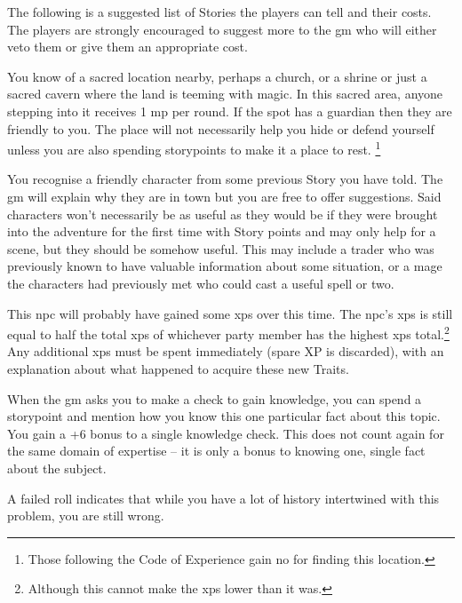 \begin{multicols}{2}

\noindent
The following is a suggested list of Stories the players can tell and their costs.
The players are strongly encouraged to suggest more to the \gls{gm} who will either veto them or give them an appropriate cost.

You know of a sacred location nearby, perhaps a church, or a shrine or just a sacred cavern where the land is teeming with magic.
In this sacred area, anyone stepping into it receives 1 \gls{mp} per \gls{round}.
If the spot has a guardian then they are friendly to you.
The place will not necessarily help you hide or defend yourself unless you are also spending \glspl{storypoint} to make it a place to rest.
\footnote{Those following the Code of Experience gain no  for finding this location.}

\label{oldnpc}
You recognise a friendly character from some previous Story you have told.
The \gls{gm} will explain why they are in town but you are free to offer suggestions.
Said characters won't necessarily be as useful as they would be if they were brought into the adventure for the first time with Story points and may only help for a scene, but they should be somehow useful.
This may include a trader who was previously known to have valuable information about some situation, or a mage the characters had previously met who could cast a useful spell or two.

This \gls{npc} will probably have gained some \glspl{xp} over this time.
The \gls{npc}'s \glspl{xp} is still equal to half the total \glspl{xp} of whichever party member has the highest \glspl{xp} total.\footnote{Although this cannot make the \glspl{xp} lower than it was.}
Any additional \glspl{xp} must be spent immediately (spare XP is discarded), with an explanation about what happened to acquire these new Traits.

When the \gls{gm} asks you to make a check to gain knowledge, you can spend a \gls{storypoint} and mention how you know this one particular fact about this topic.
You gain a +6 bonus to a single knowledge check.
This does not count again for the same domain of expertise -- it is only a bonus to knowing one, single fact about the subject.

A failed roll indicates that while you have a lot of history intertwined with this problem, you are still wrong.


\end{multicols}
